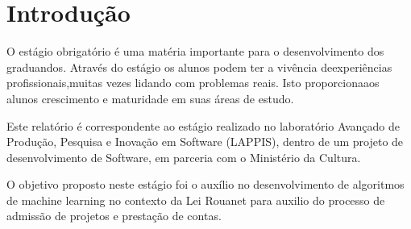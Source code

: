 \chapter[Introdução]{Introdução}

O estágio obrigatório é uma matéria importante para o desenvolvimento dos graduandos. Através do estágio os alunos podem ter a vivência deexperiências profissionais,muitas vezes lidando com problemas reais. Isto proporcionaaos alunos crescimento e maturidade em suas áreas de estudo.

Este relatório é correspondente ao estágio realizado no laboratório Avançado de Produção, Pesquisa e Inovação em Software (LAPPIS), dentro de um projeto de desenvolvimento de Software, em parceria com o Ministério da Cultura.

O objetivo proposto neste estágio foi o auxílio no desenvolvimento de algoritmos de machine learning no contexto da Lei Rouanet para auxilio do processo de admissão de projetos e prestação de contas.
